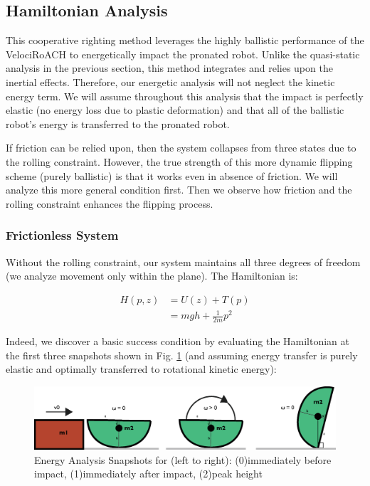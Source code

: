 \documentclass[letterpaper, 10 pt, conference]{ieeeconf}
\begin{document}
\subsection{Hamiltonian Analysis}
This cooperative righting method leverages the highly ballistic performance of the VelociRoACH to energetically impact the pronated robot.
Unlike the quasi-static analysis in the previous section, this method integrates and relies upon the inertial effects.
Therefore, our energetic analysis will not neglect the kinetic energy term.
We will assume throughout this analysis that the impact is perfectly elastic (no energy loss due to plastic deformation) and that all of the ballistic robot's energy is transferred to the pronated robot.


If friction can be relied upon, then the system collapses from three states due to the rolling constraint.
However, the true strength of this more dynamic flipping scheme (purely ballistic) is that it works even in absence of friction.
We will analyze this more general condition first. Then we observe how friction and the rolling constraint enhances the flipping process.

\subsubsection{Frictionless System} %
Without the rolling constraint, our system maintains all three degrees of freedom (we analyze movement only within the plane).
The Hamiltonian is:

\begin{align}
  H(p,z) &= U(z) + T(p) \nonumber \\
  &= m g h + \frac{1}{2 m} p^2
\end{align}

Indeed, we discover a basic success condition by evaluating the Hamiltonian at the first three snapshots shown in Fig. \ref{fig:DynFrames} (and assuming energy transfer is purely elastic and optimally transferred to rotational kinetic energy):

\begin{figure}
  \centering
  \includegraphics[width=\columnwidth]{Dyn_EnergyFrames.eps}
  \caption{\label{fig:DynFrames}Energy Analysis Snapshots for (left to right): (0)immediately before impact, (1)immediately after impact, (2)peak height}
\end{figure}
\end{document}
